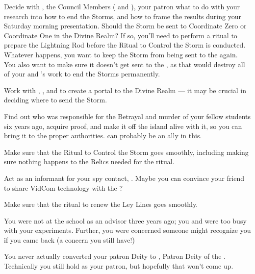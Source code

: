 \documentclass[char]{GL2020}
\begin{document}
\begin{itemz}
    \item Decide with \cHeadScientist{} , the Council Members (\cAntiChup{} and \cTechStar{}), your patron \cDiplomat{} what to do with your research into how to end the Storms, and how to frame the results during your Saturday morning presentation. Should the Storm be sent to Coordinate Zero or Coordinate One in the Divine Realm? If so, you'll need to perform a ritual to prepare the Lightning Rod before the Ritual to Control the Storm is conducted. Whatever happens, you want to keep the Storm from being sent to the \pShip{} again. You also want to make sure it doesn’t get sent to the \pTech{}, as that would destroy all of your and \cHeadScientist{}’s work to end the Storms permanently.
    \item Work with \cCurse{}, \cFlowPriest{}, and \cAmbition{} to create a portal to the Divine Realm — it may be crucial in deciding where to send the Storm.
    \item Find out who was responsible for the Betrayal and murder of your fellow students six years ago, acquire proof, and make it off the island alive with it, so you can bring it to the proper authorities. \cHeir{} can probably be an ally in this.
    \item Make sure that the Ritual to Control the Storm goes smoothly, including making sure nothing happens to the Relics needed for the ritual. 
    \item Act as an informant for your \pShippie{} spy contact, \cBunker{}. Maybe you can convince your friend \cTechStar{} to share \cTechStar{\their} VidCom technology with the \pShippies{}?
    \item Make sure that the ritual to renew the Ley Lines goes smoothly.
\end{itemz}

\begin{itemz}[Notes]
    \item You were not at the school as an advisor three years ago; you and \cHeadScientist{} were too busy with your experiments. Further, you were concerned someone might recognize you if you came back (a concern you still have!)
    \item You never actually converted your patron Deity to \cTechGod{}, Patron Deity of the \pTech{}. Technically you still hold \cFarmGod{} as your patron, but hopefully that won't come up.
\end{itemz}
\end{document}
